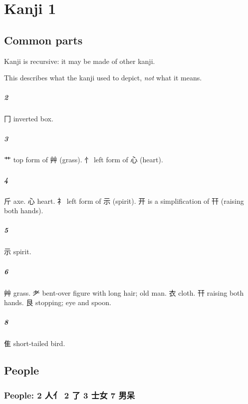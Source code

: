 \chapter{Kanji 1}

\section{Common parts}

Kanji is recursive: it may be made of other kanji.

This describes what the kanji used to depict, \emph{not} what it means.

\paragraph{2}
冂 inverted box.

\paragraph{3}
艹 top form of 艸 (grass).
忄 left form of 心 (heart).

\paragraph{4}
斤 axe.
心 heart.
礻 left form of ⽰ (spirit).
开 is a simplification of 幵 (raising both hands).

\paragraph{5}
⽰ spirit.

\paragraph{6}
艸 grass.
耂 bent-over figure with long hair; old man.
衣 cloth.
幵 raising both hands.
艮 stopping; eye and spoon.

\paragraph{8}
隹 short-tailed bird.

\section{People}

\subsection{People: 2 人亻 2 了 3 士女 7 男呆}

